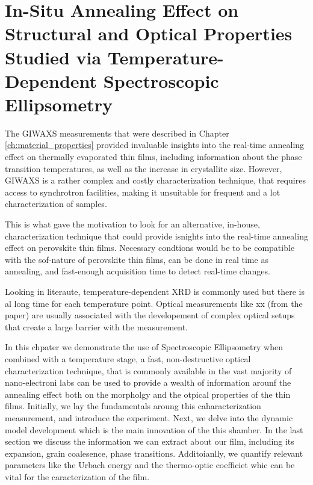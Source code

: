 \chapter{In-Situ Annealing Effect on Structural and Optical Properties Studied via Temperature-Dependent Spectroscopic Ellipsometry}\label{ch:ellipsometry}


The GIWAXS measurements that were described in Chapter \ref{ch:material_properties} provided invaluable insights into the real-time annealing effect on thermally evaporated  thin films, including information about the phase transition temperatures, as well as the increase in crystallite size. However, GIWAXS is a rather complex and costly characterization technique, that requires access to synchrotron facilities, making it unsuitable for frequent and a lot characterization of samples. 

This is what gave the motivation to look for an alternative, in-house, characterization technique that could provide isnights into the real-time annealing effect on perovskite thin films. Necessary condtions would be to be compatible with the sof-nature of perovskite thin films, can be done in real time as annealing, and fast-enough acquisition time to detect real-time changes. 

Looking in literaute, temperature-dependent XRD is commonly used but there is al long time for each temperature point. Optical measurements like xx (from the paper) are usually associated with the developement of complex optical setups that create a large barrier with the measurement. 

In this chpater we demonstrate the use of Spectroscopic Ellipsometry when combined with a temperature stage, a fast, non-destructive optical characterization technique, that is commonly available in the vast majority of nano-electroni labs can be used to provide a wealth of information arounf the annealing effect both on the morpholgy and the otpical properties of the thin films. 
Initially, we lay the fundamentals aroung this caharacterization measurement, and introduce the experiment. Next, we delve into the dynamic model development which is the main innovation of the this shamber. In the last section we discuss the information we can extract about our film, including its expansion, grain coalesence, phase transitions. Additoianlly, we quantify relevant parameters like the Urbach energy and the thermo-optic coefficiet whic can be vital for the caracterization of the film. 




